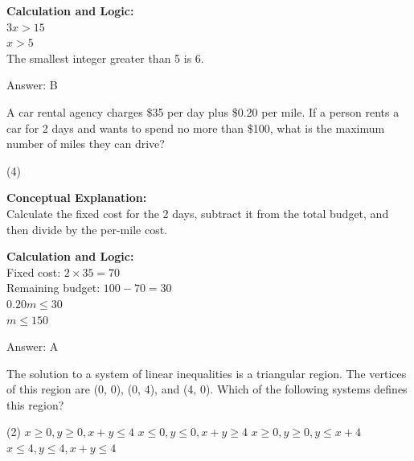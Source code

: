 \documentclass[11pt,paper=a4,answers]{exam}
\begin{document}
\begin{questions}
\begin{solution}
\vspace{10pt}
\textbf{Calculation and Logic:} \\
$3x > 15$ \\
$x > 5$ \\
The smallest integer greater than 5 is 6.

\vspace{15pt}
Answer: \colorbox{yellow!100}{B}
\end{solution}

\vspace{20pt}

\question
A car rental agency charges \$35 per day plus \$0.20 per mile. If a person rents a car for 2 days and wants to spend no more than \$100, what is the maximum number of miles they can drive?
\begin{tasks}(4)
\end{tasks}

\begin{solution}
\textbf{Conceptual Explanation:} \\
Calculate the fixed cost for the 2 days, subtract it from the total budget, and then divide by the per-mile cost.

\vspace{10pt}
\textbf{Calculation and Logic:} \\
Fixed cost: $2 \times 35 = 70$ \\
Remaining budget: $100 - 70 = 30$ \\
$0.20m \le 30$ \\
$m \le 150$

\vspace{15pt}
Answer: \colorbox{yellow!100}{A}
\end{solution}

\vspace{20pt}

\question
The solution to a system of linear inequalities is a triangular region. The vertices of this region are (0, 0), (0, 4), and (4, 0). Which of the following systems defines this region?
\begin{tasks}(2)
    \task $x \ge 0, y \ge 0, x + y \le 4$
    \task $x \le 0, y \le 0, x + y \ge 4$
    \task $x \ge 0, y \ge 0, y \le x + 4$
    \task $x \le 4, y \le 4, x + y \le 4$
\end{tasks}


\end{questions}
\end{document}
